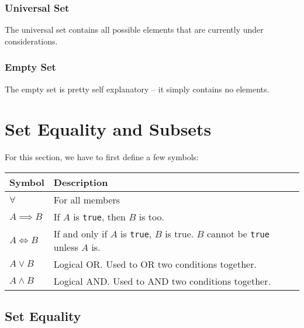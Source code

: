 \subsubsection{Universal Set}\label{ssub:universal_set}

The universal set contains all possible elements that are currently under considerations.

\subsubsection{Empty Set}\label{ssub:empty_set}

The empty set is pretty self explanatory -- it simply contains no elements.

\section{Set Equality and Subsets}\label{sec:set_equality_and_subsets}

For this section, we have to first define a few symbols:

\begin{tabular}{ll}
    \toprule
    Symbol           & Description                                                                                                              \\
    \midrule
    \(\forall \)     & For all members                                                                                                          \\
    \(A \implies B\) & If \(A\) is \texttt{true}, then \(B\) is too.                                                                  \\
    \(A \iff B\)     & If and only if \(A\) is \texttt{true}, \(B\) is true. \(B\) cannot be \texttt{true} unless \(A\) is. \\
    \(A \lor B\)     & Logical OR. Used to OR two conditions together.                                                                          \\
    \(A \land B\)    & Logical AND. Used to AND two conditions together.                                                                        \\
    \bottomrule
\end{tabular}

\subsection{Set Equality}\label{sub:set_equality}

